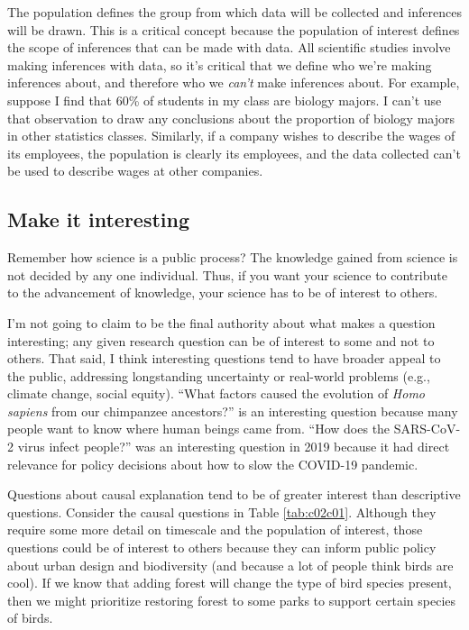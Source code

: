 \documentclass[
]{book}
\begin{document}
The population defines the group from which data will be collected and inferences will be drawn. This is a critical concept because the population of interest defines the scope of inferences that can be made with data. All scientific studies involve making inferences with data, so it's critical that we define who we're making inferences about, and therefore who we \emph{can't} make inferences about. For example, suppose I find that 60\% of students in my class are biology majors. I can't use that observation to draw any conclusions about the proportion of biology majors in other statistics classes. Similarly, if a company wishes to describe the wages of its employees, the population is clearly its employees, and the data collected can't be used to describe wages at other companies.

\subsection{Make it interesting}\label{make-it-interesting}

Remember how science is a public process? The knowledge gained from science is not decided by any one individual. Thus, if you want your science to contribute to the advancement of knowledge, your science has to be of interest to others.

I'm not going to claim to be the final authority about what makes a question interesting; any given research question can be of interest to some and not to others. That said, I think interesting questions tend to have broader appeal to the public, addressing longstanding uncertainty or real-world problems (e.g., climate change, social equity). ``What factors caused the evolution of \emph{Homo sapiens} from our chimpanzee ancestors?'' is an interesting question because many people want to know where human beings came from. ``How does the SARS-CoV-2 virus infect people?'' was an interesting question in 2019 because it had direct relevance for policy decisions about how to slow the COVID-19 pandemic.

Questions about causal explanation tend to be of greater interest than descriptive questions. Consider the causal questions in Table \ref{tab:c02c01}. Although they require some more detail on timescale and the population of interest, those questions could be of interest to others because they can inform public policy about urban design and biodiversity (and because a lot of people think birds are cool). If we know that adding forest will change the type of bird species present, then we might prioritize restoring forest to some parks to support certain species of birds.
\end{document}
